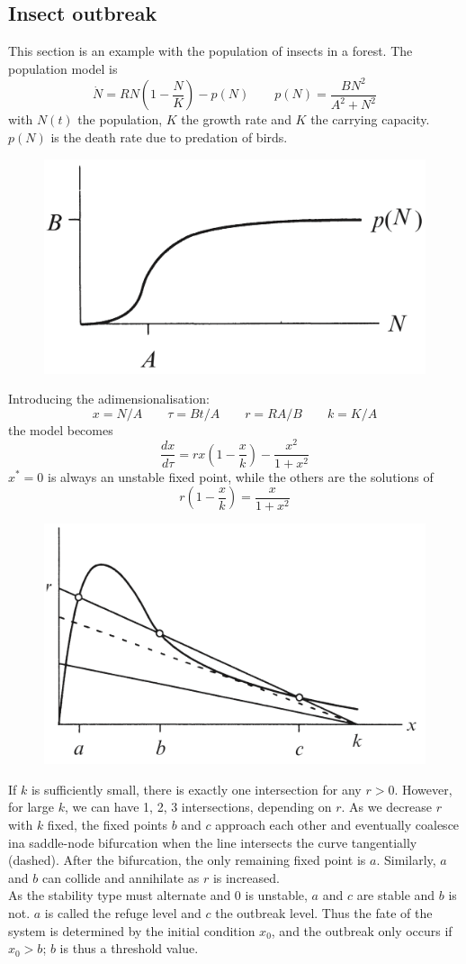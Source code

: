 \documentclass[12pt, openany]{report}
\theoremstyle{definition}
\begin{document}
\subsection{Insect outbreak}
This section is an example with the population of insects in a forest. The population model is 
\begin{equation}
    \dot N = RN\left(1-\frac{N}{K}\right) -p(N)\qquad p(N) = \frac{BN^2}{A^2+N^2}
\end{equation}
with $N(t)$ the population, $K$ the growth rate and $K$ the carrying capacity. $p(N)$ is the death rate due to predation of birds. 
\begin{figure}[H]
    \centering
    \includegraphics[width = .3\textwidth]{img/predation.png}
\end{figure}
Introducing the adimensionalisation:
\begin{equation}
    x=N/A \qquad \tau = Bt/A \qquad r=RA/B\qquad k=K/A
\end{equation}
the model becomes
\begin{equation}
    \frac{dx}{d\tau}=rx\left(1- \frac{x}{k}\right)-\frac{x^2}{1+x^2}
\end{equation}
$x^*=0$ is always an unstable fixed point, while the others are the solutions of 
\begin{equation}
    r\left(1-\frac{x}{k}\right) = \frac{x}{1+x^2}
\end{equation}
\begin{figure}[H]
    \includegraphics[width=.4\textwidth]{img/budworm.png}
\end{figure}
If $k$ is sufficiently small, there is exactly one intersection for any $r>0$. However, for large $k$, we can have 1, 2, 3 intersections, depending on $r$. As we decrease $r$ with $k$ fixed, the fixed points $b$ and $c$ approach each other and eventually coalesce ina  saddle-node bifurcation when the line intersects the curve tangentially (dashed). After the bifurcation, the only remaining fixed point is $a$. Similarly, $a$ and $b$ can collide and annihilate as $r$ is increased. \\
As the stability type must alternate and 0 is unstable, $a$ and $c$ are stable and $b$ is not. $a$ is called the refuge level and $c$ the outbreak level. Thus the fate of the system is determined by the initial condition $x_0$, and the outbreak only occurs if $x_0>b$; $b$ is thus a threshold value.
\end{document}
